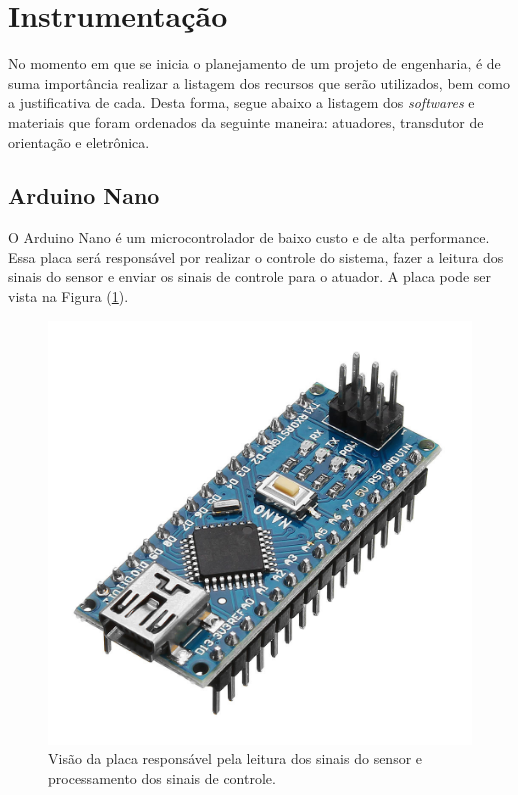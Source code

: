 \section{Instrumentação}

No momento em que se inicia o planejamento de um projeto de engenharia, é de suma importância
realizar a listagem dos recursos que serão utilizados, bem como a justificativa de cada. Desta
forma, segue abaixo a listagem dos \textit{softwares} e materiais que foram ordenados da seguinte maneira: atuadores, transdutor de orientação e eletrônica.

\subsection{Arduino Nano}

O Arduino Nano é um microcontrolador de baixo custo e de alta performance. Essa placa será responsável por realizar o controle do sistema, fazer a leitura dos sinais do sensor e enviar os sinais de controle para o atuador. A placa pode ser vista na Figura (\ref{fig:ArduinoNano}).
\begin{figure}[H]
    \centering
    \includegraphics[scale=0.15]{Metodologia/arduinoNano}
    \caption{Visão da placa responsável pela leitura dos sinais do sensor e processamento dos sinais de controle.}
    \label{fig:ArduinoNano}
\end{figure}

